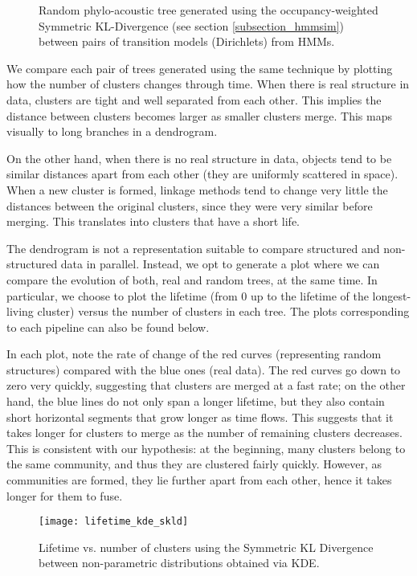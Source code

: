 \documentclass[../main.tex]{subfiles}
\begin{document}
\begin{sidewaysfigure}[!ht]
\noindent{}
    \caption{Random phylo-acoustic tree generated using the occupancy-weighted Symmetric KL-Divergence (see section \ref{subsection_hmmsim}) between pairs of transition models (Dirichlets) from HMMs.}
    \label{fig:rhmmweighted}
\end{sidewaysfigure}
\clearpage
\par We compare each pair of trees generated using the same technique by plotting how the number of clusters changes through time. When there is real structure in data, clusters are tight and well separated from each other. This implies the distance between clusters becomes larger as smaller clusters merge. This maps visually to long branches in a dendrogram. 
\par On the other hand, when there is no real structure in data, objects tend to be similar distances apart from each other (they are uniformly scattered in space). When a new cluster is formed, linkage methods tend to change very little the distances between the original clusters, since they were very similar before merging. This translates into clusters that have a short life.
\par The dendrogram is not a representation suitable to compare structured and non-structured data in parallel. Instead, we opt to generate a plot where we can compare the evolution of both, real and random trees, at the same time. In particular, we choose to plot the lifetime (from 0 up to the lifetime of the longest-living cluster) versus the number of clusters in each tree. The plots corresponding to each pipeline can also be found below.
\par In each plot, note the rate of change of the red curves (representing random structures) compared with the blue ones (real data). The red curves go down to zero very quickly, suggesting that clusters are merged at a fast rate; on the other hand, the blue lines do not only span a longer lifetime, but they also contain short horizontal segments that grow longer as time flows. This suggests that it takes longer for clusters to merge as the number of remaining clusters decreases. This is consistent with our hypothesis: at the beginning, many clusters belong to the same community, and thus they are clustered fairly quickly. However, as communities are formed, they lie further apart from each other, hence it takes longer for them to fuse.
\begin{figure}[H]
\centering
\texttt{[image: lifetime\_kde\_skld]}
\caption{Lifetime vs. number of clusters using the Symmetric KL Divergence between non-parametric distributions obtained via KDE.}
\label{fig_lt_kde_skld}
\end{figure}
\end{document}
